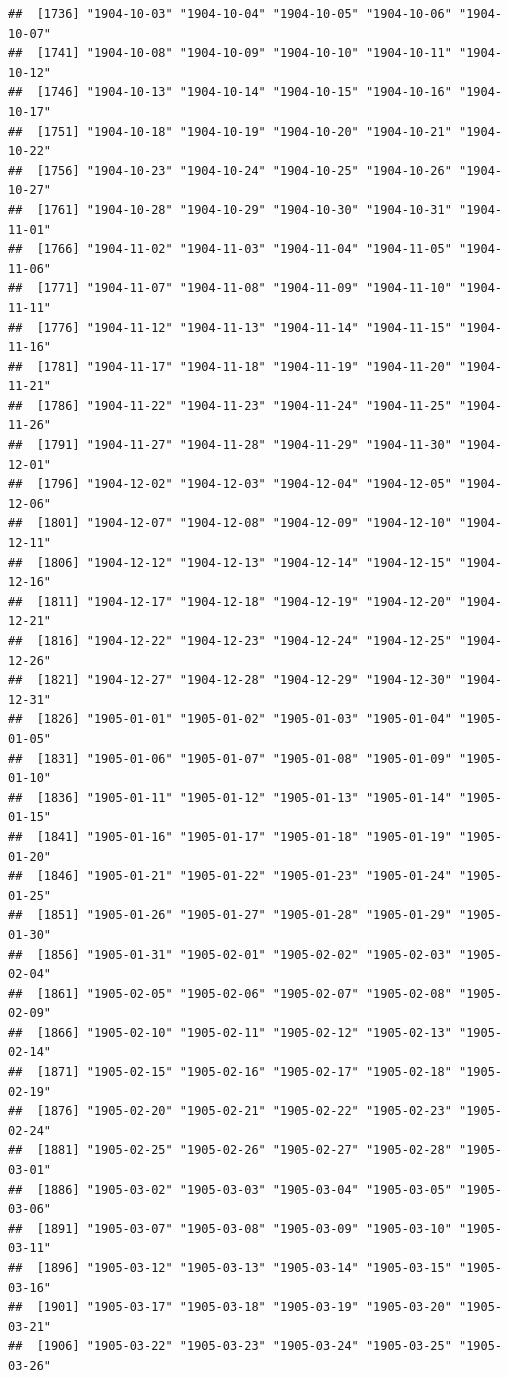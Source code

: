 \documentclass{article}\usepackage[]{graphicx}\usepackage[]{color}
\makeatletter
\newenvironment{kframe}{%
 \def\at@end@of@kframe{}%
 \ifinner\ifhmode%
  \def\at@end@of@kframe{\end{minipage}}%
  \begin{minipage}{\columnwidth}%
 \fi\fi%
 \def\FrameCommand##1{\hskip\@totalleftmargin \hskip-\fboxsep
 \colorbox{shadecolor}{##1}\hskip-\fboxsep
     \hskip-\linewidth \hskip-\@totalleftmargin \hskip\columnwidth}%
 \MakeFramed {\advance\hsize-\width
   \@totalleftmargin\z@ \linewidth\hsize
   \@setminipage}}%
 {\par\unskip\endMakeFramed%
 \at@end@of@kframe}
\newenvironment{knitrout}{}{} %
\makeatother
\begin{document}
\begin{description}
\begin{knitrout}
\begin{kframe}
\begin{verbatim}
##  [1736] "1904-10-03" "1904-10-04" "1904-10-05" "1904-10-06" "1904-10-07"
##  [1741] "1904-10-08" "1904-10-09" "1904-10-10" "1904-10-11" "1904-10-12"
##  [1746] "1904-10-13" "1904-10-14" "1904-10-15" "1904-10-16" "1904-10-17"
##  [1751] "1904-10-18" "1904-10-19" "1904-10-20" "1904-10-21" "1904-10-22"
##  [1756] "1904-10-23" "1904-10-24" "1904-10-25" "1904-10-26" "1904-10-27"
##  [1761] "1904-10-28" "1904-10-29" "1904-10-30" "1904-10-31" "1904-11-01"
##  [1766] "1904-11-02" "1904-11-03" "1904-11-04" "1904-11-05" "1904-11-06"
##  [1771] "1904-11-07" "1904-11-08" "1904-11-09" "1904-11-10" "1904-11-11"
##  [1776] "1904-11-12" "1904-11-13" "1904-11-14" "1904-11-15" "1904-11-16"
##  [1781] "1904-11-17" "1904-11-18" "1904-11-19" "1904-11-20" "1904-11-21"
##  [1786] "1904-11-22" "1904-11-23" "1904-11-24" "1904-11-25" "1904-11-26"
##  [1791] "1904-11-27" "1904-11-28" "1904-11-29" "1904-11-30" "1904-12-01"
##  [1796] "1904-12-02" "1904-12-03" "1904-12-04" "1904-12-05" "1904-12-06"
##  [1801] "1904-12-07" "1904-12-08" "1904-12-09" "1904-12-10" "1904-12-11"
##  [1806] "1904-12-12" "1904-12-13" "1904-12-14" "1904-12-15" "1904-12-16"
##  [1811] "1904-12-17" "1904-12-18" "1904-12-19" "1904-12-20" "1904-12-21"
##  [1816] "1904-12-22" "1904-12-23" "1904-12-24" "1904-12-25" "1904-12-26"
##  [1821] "1904-12-27" "1904-12-28" "1904-12-29" "1904-12-30" "1904-12-31"
##  [1826] "1905-01-01" "1905-01-02" "1905-01-03" "1905-01-04" "1905-01-05"
##  [1831] "1905-01-06" "1905-01-07" "1905-01-08" "1905-01-09" "1905-01-10"
##  [1836] "1905-01-11" "1905-01-12" "1905-01-13" "1905-01-14" "1905-01-15"
##  [1841] "1905-01-16" "1905-01-17" "1905-01-18" "1905-01-19" "1905-01-20"
##  [1846] "1905-01-21" "1905-01-22" "1905-01-23" "1905-01-24" "1905-01-25"
##  [1851] "1905-01-26" "1905-01-27" "1905-01-28" "1905-01-29" "1905-01-30"
##  [1856] "1905-01-31" "1905-02-01" "1905-02-02" "1905-02-03" "1905-02-04"
##  [1861] "1905-02-05" "1905-02-06" "1905-02-07" "1905-02-08" "1905-02-09"
##  [1866] "1905-02-10" "1905-02-11" "1905-02-12" "1905-02-13" "1905-02-14"
##  [1871] "1905-02-15" "1905-02-16" "1905-02-17" "1905-02-18" "1905-02-19"
##  [1876] "1905-02-20" "1905-02-21" "1905-02-22" "1905-02-23" "1905-02-24"
##  [1881] "1905-02-25" "1905-02-26" "1905-02-27" "1905-02-28" "1905-03-01"
##  [1886] "1905-03-02" "1905-03-03" "1905-03-04" "1905-03-05" "1905-03-06"
##  [1891] "1905-03-07" "1905-03-08" "1905-03-09" "1905-03-10" "1905-03-11"
##  [1896] "1905-03-12" "1905-03-13" "1905-03-14" "1905-03-15" "1905-03-16"
##  [1901] "1905-03-17" "1905-03-18" "1905-03-19" "1905-03-20" "1905-03-21"
##  [1906] "1905-03-22" "1905-03-23" "1905-03-24" "1905-03-25" "1905-03-26"

\end{verbatim}
\end{kframe}
\end{knitrout}
\end{description}
\end{document}
